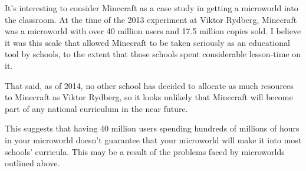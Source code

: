 It's interesting to consider Minecraft as a case study in getting a
microworld into the classroom. At the time of the 2013 experiment at
Viktor Rydberg, Minecraft was a microworld with over 40 million users
and 17.5 million copies sold. I believe it was this scale that allowed
Minecraft to be taken seriously as an educational tool by schools, to
the extent that those schools spent considerable lesson-time on it.

That said, as of 2014, no other school has decided to allocate as much
resources to Minecraft as Viktor Rydberg, so it looks unlikely that
Minecraft will become part of any national curriculum in the near
future.

This suggests that having 40 million users spending hundreds of millions of hours
in your microworld doesn't guarantee that your microworld will make it
into most schools' curricula. This may be a result of the problems faced by 
microworlds outlined above.

